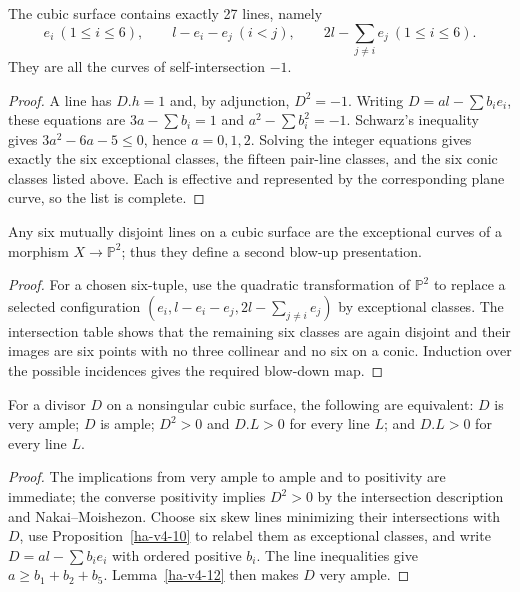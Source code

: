 \begin{theorem}
\label{ha-v4-9}
The cubic surface contains exactly 27 lines, namely
\[
 e_i\ (1\le i\le6),\qquad l-e_i-e_j\ (i<j),\qquad
 2l-\sum_{j\ne i}e_j\ (1\le i\le6).
\]
They are all the curves of self-intersection \(-1\).

\end{theorem}
\begin{proof}
A line has \(D.h=1\) and, by adjunction, \(D^2=-1\).  Writing
\(D=al-\sum b_ie_i\), these equations are
\(3a-\sum b_i=1\) and \(a^2-\sum b_i^2=-1\).  Schwarz's inequality gives
\(3a^2-6a-5\le0\), hence \(a=0,1,2\).  Solving the integer equations gives
exactly the six exceptional classes, the fifteen pair-line classes, and the
six conic classes listed above.  Each is effective and represented by the
corresponding plane curve, so the list is complete.
\end{proof}

\begin{proposition}
\label{ha-v4-10}
Any six mutually disjoint lines on a cubic surface are the exceptional curves
of a morphism \(X\to\mathbb P^2\); thus they define a second blow-up presentation.

\end{proposition}
\begin{proof}
For a chosen six-tuple, use the quadratic transformation of \(\mathbb P^2\) to
replace a selected configuration \((e_i,l-e_i-e_j,2l-\sum_{j\ne i}e_j)\) by
exceptional classes.  The intersection table shows that the remaining six
classes are again disjoint and their images are six points with no three
collinear and no six on a conic.  Induction over the possible incidences gives
the required blow-down map.
\end{proof}

\begin{theorem}
\label{ha-v4-11}
For a divisor \(D\) on a nonsingular cubic surface, the following are equivalent:
\(D\) is very ample; \(D\) is ample; \(D^2>0\) and \(D.L>0\) for every line
\(L\); and \(D.L>0\) for every line \(L\).
\end{theorem}
\begin{proof}
The implications from very ample to ample and to positivity are immediate;
the converse positivity implies \(D^2>0\) by the intersection description and
Nakai--Moishezon.  Choose six skew lines minimizing their intersections with
\(D\), use Proposition~\ref{ha-v4-10} to relabel them as exceptional classes,
and write \(D=al-\sum b_ie_i\) with ordered positive \(b_i\).  The line
inequalities give \(a\ge b_1+b_2+b_5\).  Lemma~\ref{ha-v4-12} then makes \(D\)
very ample.
\end{proof}


